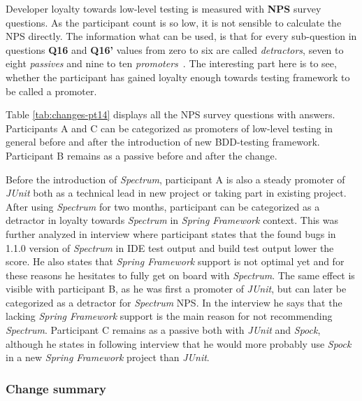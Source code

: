 Developer loyalty towards low-level testing is measured with \textbf{NPS} survey questions. As the participant count is so low, it is not
sensible to calculate the NPS \noindent directly. The information what can be used, is that for every sub-question in questions
\textbf{Q16} and \textbf{Q16'} values from zero to six are called \textit{detractors}, seven to eight \textit{passives} and
nine to ten \textit{promoters}~\cite{reichheld2003one}. The interesting part here is to see,
whether the participant has gained loyalty enough
towards testing framework to be called a promoter.


Table \ref{tab:changes-pt14} displays all the NPS survey questions with answers.
Participants A and C can be categorized as promoters of low-level testing
in general before and after the introduction of new BDD-testing framework. Participant B remains as a
passive before and after the change.

Before the introduction of \textit{Spectrum}, participant A
is also a steady promoter of \textit{JUnit} both as a technical lead in new project or taking part in existing project. After
using \textit{Spectrum} for two months, participant can be categorized as a detractor in loyalty towards \textit{Spectrum} in \textit{Spring Framework} context.
This was further
analyzed in interview where participant states that the found bugs in 1.1.0 version of \textit{Spectrum} in IDE test output and build test output
lower the score. He also states that \textit{Spring Framework} support is not optimal yet and for these reasons he hesitates
to fully get on board with \textit{Spectrum}.
The same effect is visible with participant B, as he was first a promoter of \textit{JUnit}, but can later be categorized as a detractor for \textit{Spectrum} NPS.
In the interview he says that the lacking \textit{Spring Framework} support is the main reason for not recommending \textit{Spectrum}.
Participant C remains as a passive both with \textit{JUnit} and \textit{Spock}, although he states in following interview that he would more
probably use \textit{Spock} in a new \textit{Spring Framework} project than \textit{JUnit}.

\subsubsection{Change summary}


